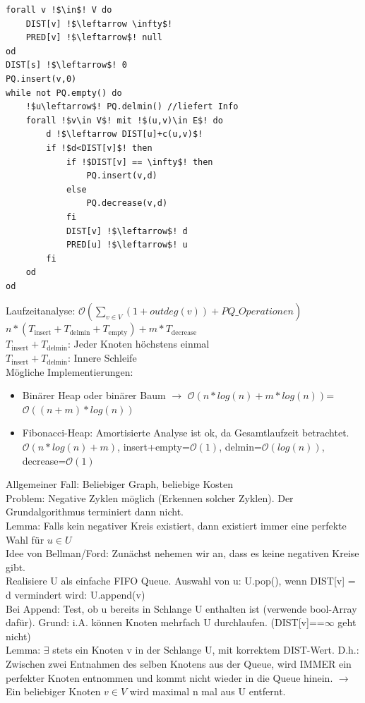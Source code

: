 \documentclass[a4paper]{article}
\newcommand{\oh}[1]{$\mathcal{O}(#1)$}
\begin{document}
\begin{lstlisting}[escapechar=!,frame=single]
forall v !$\in$! V do
	DIST[v] !$\leftarrow \infty$!
	PRED[v] !$\leftarrow$! null
od
DIST[s] !$\leftarrow$! 0
PQ.insert(v,0)
while not PQ.empty() do
	!$u\leftarrow$! PQ.delmin() //liefert Info
	forall !$v\in V$! mit !$(u,v)\in E$! do
		d !$\leftarrow DIST[u]+c(u,v)$!
		if !$d<DIST[v]$! then
			if !$DIST[v] == \infty$! then
				PQ.insert(v,d)
			else
				PQ.decrease(v,d)
			fi
			DIST[v] !$\leftarrow$! d
			PRED[u] !$\leftarrow$! u
		fi
	od
od
\end{lstlisting}
Laufzeitanalyse:
\oh{\sum_{v\in V} (1+outdeg(v)) + PQ\_Operationen}
$n*(T_{\text{insert}} + T_{\text{delmin}} + T_{\text{empty}}) + m*T_{\text{decrease}}$ \\
$T_{\text{insert}} + T_{\text{delmin}}$: Jeder Knoten höchstens einmal\\
$T_{\text{insert}} + T_{\text{delmin}}$: Innere Schleife\\
Mögliche Implementierungen:\\
\begin{itemize}
\item Binärer Heap oder binärer Baum $\rightarrow$ \oh{n*log(n)+m*log(n)}=\oh{(n+m)*log(n)}
\item Fibonacci-Heap: Amortisierte Analyse ist ok, da Gesamtlaufzeit betrachtet.\\
\oh{n*log(n)+m}, insert+empty=\oh{1}, delmin=\oh{log(n)}, decrease=\oh{1}
\end{itemize}
Allgemeiner Fall: Beliebiger Graph, beliebige Kosten\\
Problem: Negative Zyklen möglich (Erkennen solcher Zyklen). Der Grundalgorithmus terminiert dann nicht.\\
Lemma: Falls kein negativer Kreis existiert, dann existiert immer eine perfekte Wahl für $u\in U$\\
Idee von Bellman/Ford: Zunächst nehemen wir an, dass es keine negativen Kreise gibt.\\
Realisiere U als einfache FIFO Queue. Auswahl von u: U.pop(), wenn DIST[v] = d vermindert wird: U.append(v)\\
Bei Append: Test, ob u bereits in Schlange U enthalten ist (verwende bool-Array dafür). Grund: i.A. können Knoten mehrfach U durchlaufen. (DIST[v]==$\infty$ geht nicht)\\
Lemma: $\exists$ stets ein Knoten v in der Schlange U, mit korrektem DIST-Wert. D.h.: Zwischen zwei Entnahmen des selben Knotens aus der Queue, wird IMMER ein perfekter Knoten entnommen und kommt nicht wieder in die Queue hinein. $\rightarrow$ Ein beliebiger Knoten $v\in V$ wird maximal n mal aus U entfernt.\\
\end{document}
